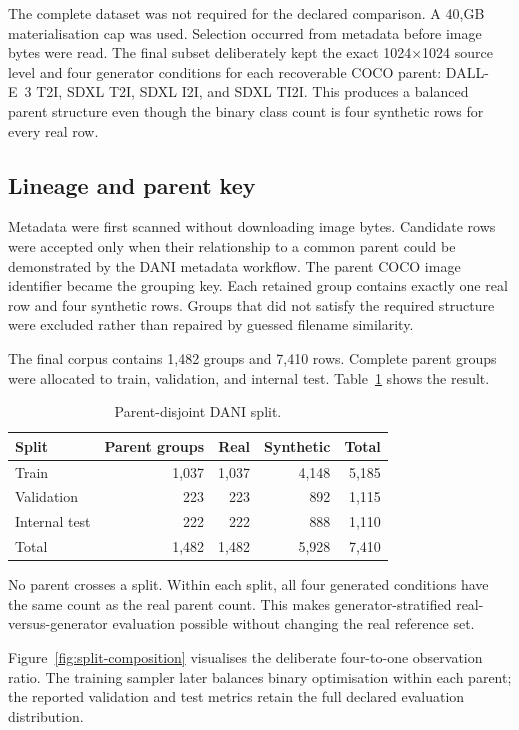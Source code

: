 \documentclass[12pt,a4paper]{article}
\begin{document}
The complete dataset was not required for the declared comparison. A 40,GB materialisation cap was
used. Selection occurred from metadata before image bytes were read. The final subset deliberately
kept the exact 1024×1024 source level and four generator conditions for each recoverable COCO parent:
DALL-E~3 T2I, SDXL T2I, SDXL I2I, and SDXL TI2I. This produces a balanced parent structure even
though the binary class count is four synthetic rows for every real row.

\subsection{Lineage and parent key}

Metadata were first scanned without downloading image bytes. Candidate rows were accepted only
when their relationship to a common parent could be demonstrated by the DANI metadata workflow.
The parent COCO image identifier became the grouping key. Each retained group contains exactly one
real row and four synthetic rows. Groups that did not satisfy the required structure were excluded
rather than repaired by guessed filename similarity.

The final corpus contains 1,482 groups and 7,410 rows. Complete parent groups were allocated to
train, validation, and internal test. Table~\ref{tab:split} shows the result.

\begin{table}[ht]
\centering
\caption{Parent-disjoint DANI split.}
\label{tab:split}
\begin{tabular}{lrrrr}
\toprule
Split & Parent groups & Real & Synthetic & Total\\
\midrule
Train & 1,037 & 1,037 & 4,148 & 5,185\\
Validation & 223 & 223 & 892 & 1,115\\
Internal test & 222 & 222 & 888 & 1,110\\
\midrule
Total & 1,482 & 1,482 & 5,928 & 7,410\\
\bottomrule
\end{tabular}
\end{table}

No parent crosses a split. Within each split, all four generated conditions have the same count as
the real parent count. This makes generator-stratified real-versus-generator evaluation possible
without changing the real reference set.

Figure~\ref{fig:split-composition} visualises the deliberate four-to-one observation ratio. The
training sampler later balances binary optimisation within each parent; the reported validation
and test metrics retain the full declared evaluation distribution.
\end{document}
